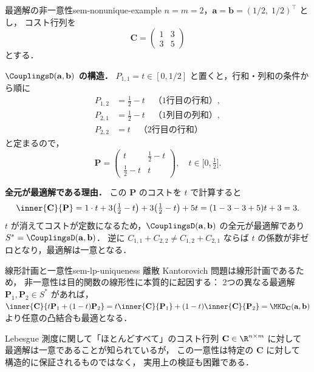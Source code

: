 \begin{example}{最適解の非一意性}{sem-nonunique-example}
  $n = m = 2$，$\mathbf{a} = \mathbf{b} = (1/2,\; 1/2)^\top$ とし，
  コスト行列を
  \[
    \mathbf{C} = \begin{pmatrix} 1 & 3 \\ 3 & 5 \end{pmatrix}
  \]
  とする．

  \textbf{$\CouplingsD(\mathbf{a},\mathbf{b})$ の構造．}
  $P_{1,1} = t \in [0, 1/2]$ と置くと，行和・列和の条件から順に
  \begin{align*}
    P_{1,2} &= \tfrac{1}{2} - t \quad \text{（1行目の行和）},\\
    P_{2,1} &= \tfrac{1}{2} - t \quad \text{（1列目の列和）},\\
    P_{2,2} &= t              \quad \text{（2行目の行和）}
  \end{align*}
  と定まるので，
  \[
    \mathbf{P} = \begin{pmatrix} t & \tfrac{1}{2}-t \\ \tfrac{1}{2}-t & t \end{pmatrix}, \quad t \in \bigl[0,\tfrac{1}{2}\bigr].
  \]

  \textbf{全元が最適解である理由．}
  この $\mathbf{P}$ のコストを $t$ で計算すると
  \[
    \inner{\mathbf{C}}{\mathbf{P}}
    = 1 \cdot t + 3\!\left(\tfrac{1}{2}-t\right) + 3\!\left(\tfrac{1}{2}-t\right) + 5t
    = (1 - 3 - 3 + 5)t + 3 = 3.
  \]
  $t$ が消えてコストが定数になるため，$\CouplingsD(\mathbf{a},\mathbf{b})$ の全元が最適解であり
  $S^* = \CouplingsD(\mathbf{a},\mathbf{b})$．
  逆に $C_{1,1} + C_{2,2} \neq C_{1,2} + C_{2,1}$ ならば $t$ の係数が非ゼロとなり，最適解は一意となる．
\end{example}

\begin{remark}{線形計画と一意性}{sem-lp-uniqueness}
  離散 Kantorovich 問題は線形計画であるため，
  非一意性は目的関数の線形性に本質的に起因する：
  2つの異なる最適解 $\mathbf{P}_1, \mathbf{P}_2 \in S^*$ があれば，
  $\inner{\mathbf{C}}{t\mathbf{P}_1 + (1-t)\mathbf{P}_2}
  = t\inner{\mathbf{C}}{\mathbf{P}_1} + (1-t)\inner{\mathbf{C}}{\mathbf{P}_2}
  = \MKD_{\mathbf{C}}(\mathbf{a},\mathbf{b})$
  より任意の凸結合も最適となる．

  Lebesgue 測度に関して「ほとんどすべて」のコスト行列
  $\mathbf{C} \in \R^{n \times m}$ に対して
  最適解は一意であることが知られているが，
  この一意性は特定の $\mathbf{C}$ に対して
  構造的に保証されるものではなく，
  実用上の検証も困難である．
\end{remark}

